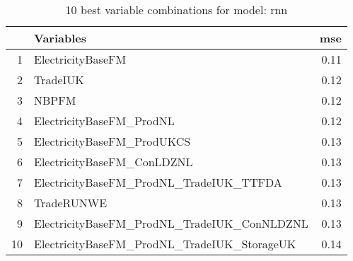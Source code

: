 \begin{table}[ht]
\centering
\begin{tabular}{rlr}
  \hline
 & Variables & mse \\ 
  \hline
1 & ElectricityBaseFM & 0.11 \\ 
  2 & TradeIUK & 0.12 \\ 
  3 & NBPFM & 0.12 \\ 
  4 & ElectricityBaseFM\_ProdNL & 0.12 \\ 
  5 & ElectricityBaseFM\_ProdUKCS & 0.13 \\ 
  6 & ElectricityBaseFM\_ConLDZNL & 0.13 \\ 
  7 & ElectricityBaseFM\_ProdNL\_TradeIUK\_TTFDA & 0.13 \\ 
  8 & TradeRUNWE & 0.13 \\ 
  9 & ElectricityBaseFM\_ProdNL\_TradeIUK\_ConNLDZNL & 0.13 \\ 
  10 & ElectricityBaseFM\_ProdNL\_TradeIUK\_StorageUK & 0.14 \\ 
   \hline
\end{tabular}
\caption{10 best variable combinations for model: rnn} 
\label{tab:rnn_top_10}
\end{table}
